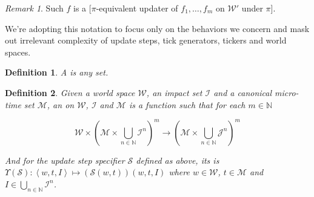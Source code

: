 \documentclass{book}
\newtheorem{definition}{Definition}
\theoremstyle{definition}\newtheorem{mechanism}{Mechanism}
\theoremstyle{remark}\newtheorem*{remark}{Remark}
\begin{document}
\begin{remark}
	Such $f$ is a [$\pi$-equivalent updater of $f_1, \dots, f_m$ on $\mathcal W'$ under $\pi$].
	
	We're adopting this notation to focus only on the behaviors we concern and mask out irrelevant complexity of update steps, tick generators, tickers and world spaces.
\end{remark}

\begin{definition}
	A  is any set.
\end{definition}

\begin{definition}
	Given a world space $\mathcal W$, an impact set $\mathcal I$ and a canonical micro-time set $\mathcal M$, an  on $\mathcal W$, $\mathcal I$ and $\mathcal M$ is a function such that for each $m \in \mathbb N$
	
	\begin{equation*}
		\mathcal W \times \left(\mathcal M \times \bigcup_{n \in \mathbb N} \mathcal I^n\right)^m \to \left(\mathcal M \times \bigcup_{n \in \mathbb N} \mathcal J^n\right)^m
	\end{equation*}
	
	And for the update step specifier $\mathcal S$ defined as above, its  is $\Upsilon\left(\mathcal S\right): \left<w, t, I\right> \mapsto (\mathcal{S}(w, t))(w, t, I)$ where $w\in \mathcal W$, $t\in \mathcal M$ and $I \in \bigcup_{n \in \mathbb N} \mathcal I^n$.
\end{definition}
\end{document}
